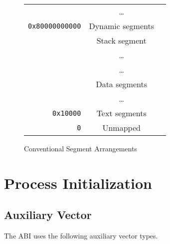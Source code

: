 \begin{figure}[H]
\Hrule
  \caption{Conventional Segment Arrangements}
  \label{fig-cfg}
  \begin{center}
    \begin{tabular}{r|c|l}
      \cline{2-2}
      & \dots & \\
      \verb|0x80000000000| & Dynamic segments & \\ \cline{2-2}
      & Stack segment & \\
      & \dots & \\ \cline{2-2}
      & \dots & \\
      & Data segments & \\ \cline{2-2}
      & \dots & \\
      \verb|0x10000| & Text segments & \\ \cline{2-2}
      \verb|0| & Unmapped & \\ \cline{2-2}
    \end{tabular}
  \end{center}
\Hrule
\end{figure}

\section{Process Initialization}

\subsection{Auxiliary Vector}

The \xARCH ABI uses the following auxiliary vector types.

